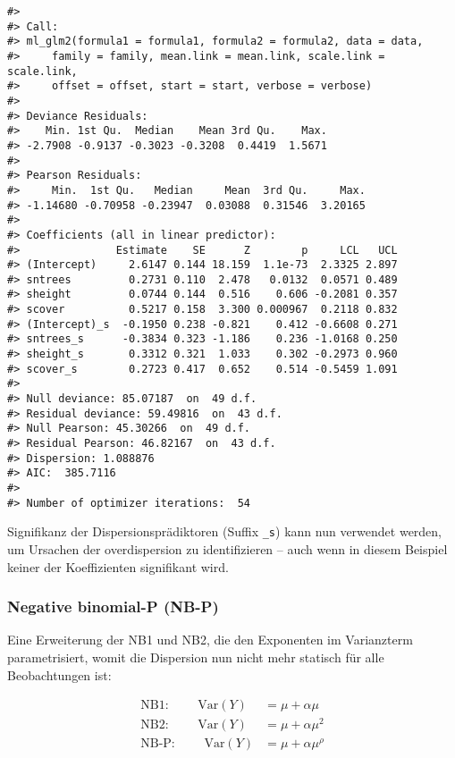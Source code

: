 \documentclass[ngerman,a4paper,]{scrartcl}
\theoremstyle{definition}
\theoremstyle{definition}
\theoremstyle{definition}
\theoremstyle{remark}
\begin{document}
\begin{verbatim}
#> 
#> Call:
#> ml_glm2(formula1 = formula1, formula2 = formula2, data = data, 
#>     family = family, mean.link = mean.link, scale.link = scale.link, 
#>     offset = offset, start = start, verbose = verbose)
#> 
#> Deviance Residuals:
#>    Min. 1st Qu.  Median    Mean 3rd Qu.    Max. 
#> -2.7908 -0.9137 -0.3023 -0.3208  0.4419  1.5671 
#> 
#> Pearson Residuals:
#>     Min.  1st Qu.   Median     Mean  3rd Qu.     Max. 
#> -1.14680 -0.70958 -0.23947  0.03088  0.31546  3.20165 
#> 
#> Coefficients (all in linear predictor):
#>               Estimate    SE      Z        p     LCL   UCL
#> (Intercept)     2.6147 0.144 18.159  1.1e-73  2.3325 2.897
#> sntrees         0.2731 0.110  2.478   0.0132  0.0571 0.489
#> sheight         0.0744 0.144  0.516    0.606 -0.2081 0.357
#> scover          0.5217 0.158  3.300 0.000967  0.2118 0.832
#> (Intercept)_s  -0.1950 0.238 -0.821    0.412 -0.6608 0.271
#> sntrees_s      -0.3834 0.323 -1.186    0.236 -1.0168 0.250
#> sheight_s       0.3312 0.321  1.033    0.302 -0.2973 0.960
#> scover_s        0.2723 0.417  0.652    0.514 -0.5459 1.091
#> 
#> Null deviance: 85.07187  on  49 d.f.
#> Residual deviance: 59.49816  on  43 d.f.
#> Null Pearson: 45.30266  on  49 d.f.
#> Residual Pearson: 46.82167  on  43 d.f.
#> Dispersion: 1.088876
#> AIC:  385.7116
#> 
#> Number of optimizer iterations:  54
\end{verbatim}

Signifikanz der Dispersionsprädiktoren (Suffix \texttt{\_s}) kann nun verwendet werden, um Ursachen der overdispersion zu identifizieren -- auch wenn in diesem Beispiel keiner der Koeffizienten signifikant wird.

\hypertarget{mod-nbp}{%
\subsubsection{Negative binomial-P (NB-P)}\label{mod-nbp}}

Eine Erweiterung der NB1 und NB2, die den Exponenten im Varianzterm parametrisiert, womit die Dispersion nun nicht mehr statisch für alle Beobachtungen ist:

\begin{align*}
\text{NB1: } \qquad \mathrm{Var}(Y) &= \mu + \alpha\mu \\
\text{NB2: } \qquad \mathrm{Var}(Y) &= \mu + \alpha\mu^2 \\
\text{NB-P: }\qquad \mathrm{Var}(Y) &= \mu + \alpha\mu^\rho
\end{align*}
\end{document}
